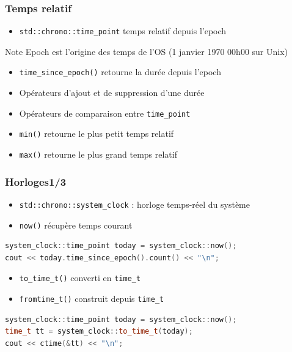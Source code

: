 \documentclass[C++.tex]{subfiles}
\begin{document}
\begin{frame}[fragile]
	\frametitle{Temps relatif}
	\begin{itemize}
		\item \lstinline|std::chrono::time_point| temps relatif depuis l'epoch
	\end{itemize}

	\begin{block}{Note}
		Epoch est l'origine des temps de l'OS (1 janvier 1970 00h00 sur Unix)
	\end{block}

	\begin{itemize}
		\item \lstinline|time_since_epoch()| retourne la durée depuis l'epoch
		\item Opérateurs d'ajout et de suppression d'une durée
		\item Opérateurs de comparaison entre \lstinline|time_point|
		\item \lstinline|min()| retourne le plus petit temps relatif
		\item \lstinline|max()| retourne le plus grand temps relatif
	\end{itemize}
\end{frame}

\begin{frame}[fragile]
	\frametitle{Horloges\titlehfill{}1/3}
	\begin{itemize}
		\item \lstinline|std::chrono::system_clock| : horloge temps-réel du système
		\item \lstinline|now()| récupère temps courant
	\end{itemize}

	\begin{lstlisting}[language=C++]
system_clock::time_point today = system_clock::now();
cout << today.time_since_epoch().count() << "\n";\end{lstlisting}

	\begin{itemize}
		\item \lstinline|to_time_t()| converti en \lstinline|time_t|
		\item \lstinline|fromtime_t()| construit depuis \lstinline|time_t|
	\end{itemize}

	\begin{lstlisting}[language=C++]
system_clock::time_point today = system_clock::now();
time_t tt = system_clock::to_time_t(today);
cout << ctime(&tt) << "\n";\end{lstlisting}
\end{frame}
\end{document}
